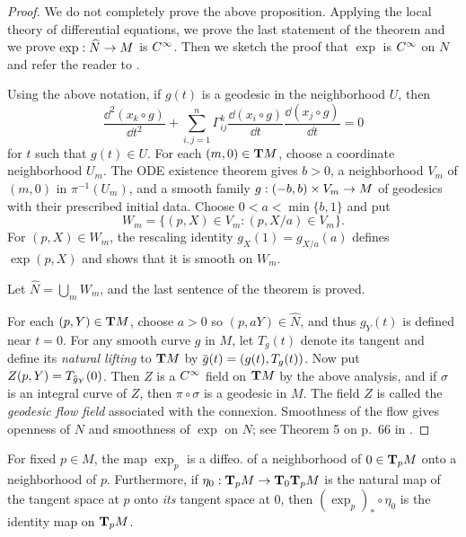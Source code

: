 \documentclass[../main]{subfiles}
\begin{document}
\begin{proof}
We do not completely prove the above proposition. Applying the local theory of differential equations, we prove the last statement of the theorem and we prove $\exp : \widehat N \functionMaps M$ is $\CInfty$. Then we sketch the proof that $\exp$ is $\CInfty$ on $N$ and refer the reader to \cite{lang2014introduction}. 

Using the above notation, if $g(t)$ is a geodesic in the neighborhood $U$, then
\[ \frac{\dd^2(x_k\circ g)}{\dd t^2}+\sum_{i,j=1}^n\Gamma_{ij}^k\frac{\dd(x_i\circ g)}{\dd t}\frac{\dd(x_j\circ g)}{\dd t}=0 \]
for $t$ such that $g(t)\in U$. For each $(m,0)\in\tangentbundle{M}$, choose a coordinate neighborhood $U_m$. The ODE existence theorem gives $b>0$, a neighborhood $V_m$ of $(m,0)$ in $\pi^{-1}(U_m)$, and a smooth family $g:(-b,b)\times V_m\functionMaps M$ of geodesics with their prescribed initial data. Choose $0<a<\min\{b,1\}$ and put
\[W_m=\{(p,X)\in V_m:(p,X/a)\in V_m\}.\]
For $(p,X)\in W_m$, the rescaling identity $g_X(1)=g_{X/a}(a)$ defines $\exp(p,X)$ and shows that it is smooth on $W_m$.

Let $\widehat N = \bigcup_m W_m$, and the last sentence of the theorem is proved.

For each $(p,Y)\in\tangentbundle{M}$, choose $a>0$ so $(p,aY)\in\widehat N$, and thus $g_Y(t)$ is defined near $t=0$. For any smooth curve $g$ in $M$, let $T_g(t)$ denote its tangent and define its \emph{natural lifting} to $\tangentbundle{M}$ by $\xoverline g(t)=(g(t),T_g(t))$. Now put $Z(p,Y)=T_{\xoverline g_Y}(0)$. Then $Z$ is a $\CInfty$ field on $\tangentbundle M$ by the above analysis, and if $\sigma$ is an integral curve of $Z$, then $\pi\circ\sigma$ is a geodesic in $M$. The field $Z$ is called the \emph{geodesic flow field} associated with the connexion. Smoothness of the flow gives openness of $N$ and smoothness of $\exp$ on $N$; see Theorem 5 on p.~66 in \cite{lang2014introduction}.
\end{proof}



\begin{corollary} \label{cor:ch9.3.2}
For fixed $p\in M$, the map $\exp_p$ is a diffeo. of a neighborhood of $0 \in \tangentspace{M}{p}$ onto a neighborhood of $p$. Furthermore, if $\eta_0 : \tangentspace{M}{p} \functionMaps \tangentspace{\tangentspace{M}{p}}{0}$ is the natural map of the tangent space at $p$ onto \emph{its} tangent space at $0$, then $(\exp_p)_\ast\circ\eta_0$ is the identity map on $\tangentspace{M}{p}$. 
\end{corollary}
\end{document}
